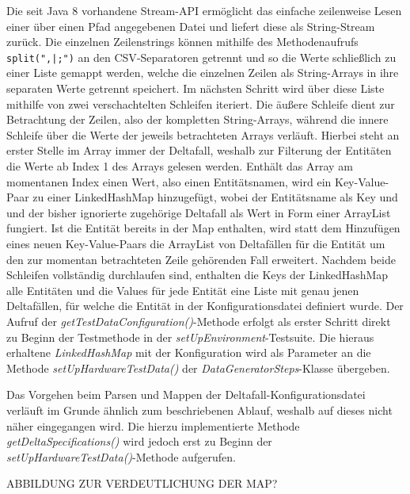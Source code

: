 Die seit Java 8 vorhandene Stream-\ac{API} ermöglicht das einfache zeilenweise Lesen einer über einen Pfad angegebenen Datei und liefert diese als String-Stream zurück. Die einzelnen Zeilenstrings können mithilfe des Methodenaufrufs \colorbox{background}{\lstinline{split(",|;")}} an den \ac{CSV}-Separatoren getrennt und so die Werte schließlich zu einer Liste gemappt werden, welche die einzelnen Zeilen als String-Arrays in ihre separaten Werte getrennt speichert. Im nächsten Schritt wird über diese Liste mithilfe von zwei verschachtelten Schleifen iteriert. Die äußere Schleife dient zur Betrachtung der Zeilen, also der kompletten String-Arrays, während die innere Schleife über die Werte der jeweils betrachteten Arrays verläuft. Hierbei steht an erster Stelle im Array immer der Deltafall, weshalb zur Filterung der Entitäten die Werte ab Index 1 des Arrays gelesen werden. Enthält das Array am momentanen Index einen Wert, also einen Entitätsnamen, wird ein Key-Value-Paar zu einer LinkedHashMap hinzugefügt, wobei der Entitätsname als Key und und der bisher ignorierte zugehörige Deltafall als Wert in Form einer ArrayList fungiert. Ist die Entität bereits in der Map enthalten, wird statt dem Hinzufügen eines neuen Key-Value-Paars die ArrayList von Deltafällen für die Entität um den zur momentan betrachteten Zeile gehörenden Fall erweitert. Nachdem beide Schleifen vollständig durchlaufen sind, enthalten die Keys der LinkedHashMap alle Entitäten und die Values für jede Entität eine Liste mit genau jenen Deltafällen, für welche die Entität in der Konfigurationsdatei definiert wurde. Der Aufruf der \textit{getTestDataConfiguration()}-Methode erfolgt als erster Schritt direkt zu Beginn der Testmethode in der \textit{setUpEnvironment}-Testsuite. Die hieraus erhaltene \textit{LinkedHashMap} mit der Konfiguration wird als Parameter an die Methode \textit{setUpHardwareTestData()} der \textit{DataGeneratorSteps}-Klasse übergeben.

Das Vorgehen beim Parsen und Mappen der Deltafall-Konfigurationsdatei verläuft im Grunde ähnlich zum beschriebenen Ablauf, weshalb auf dieses nicht näher eingegangen wird. Die hierzu implementierte Methode \textit{getDeltaSpecifications()} wird jedoch erst zu Beginn der \textit{setUpHardwareTestData()}-Methode aufgerufen.

ABBILDUNG ZUR VERDEUTLICHUNG DER MAP?

